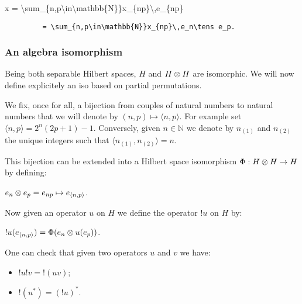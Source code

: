 \begin{description}
\tightlist
\item[]
x =
\textbackslash{}sum\_\{n,p\textbackslash{}in\textbackslash{}mathbb\{N\}\}x\_\{np\}\textbackslash{},e\_\{np\}
\end{description}

\texttt{~~~~~~~~~=~\textbackslash{}sum\_\{n,p\textbackslash{}in\textbackslash{}mathbb\{N\}\}x\_\{np\}\textbackslash{},e\_n\textbackslash{}tens~e\_p}\texttt{.}

\subsubsection{An algebra isomorphism}\label{an-algebra-isomorphism}

Being both separable Hilbert spaces, \(H\) and \(H\otimes H\) are
isomorphic. We will now define explicitely an iso based on partial
permutations.

We fix, once for all, a bijection from couples of natural numbers to
natural numbers that we will denote by
\((n,p)\mapsto\langle n,p\rangle\). For example set
\(\langle n,p\rangle = 2^n(2p+1) - 1\). Conversely, given
\(n\in\mathbb{N}\) we denote by \(n_{(1)}\) and \(n_{(2)}\) the unique
integers such that \(\langle n_{(1)},
n_{(2)}\rangle = n\).

This bijection can be extended into a Hilbert space isomorphism
\(\Phi:H\otimes H\rightarrow H\) by defining:

\begin{description}
\tightlist
\item[]
\(e_n\otimes e_p = e_{np} \mapsto e_{\langle n,p\rangle}\).
\end{description}

Now given an operator \(u\) on \(H\) we define the operator \(!u\) on
\(H\) by:

\begin{description}
\tightlist
\item[]
\(!u(e_{\langle n,p\rangle}) = \Phi(e_n\otimes u(e_p))\).
\end{description}

One can check that given two operators \(u\) and \(v\) we have:

\begin{itemize}
\tightlist
\item
  \(!u!v = {!(uv)}\);
\item
  \(!(u^*) = (!u)^*\).
\end{itemize}

